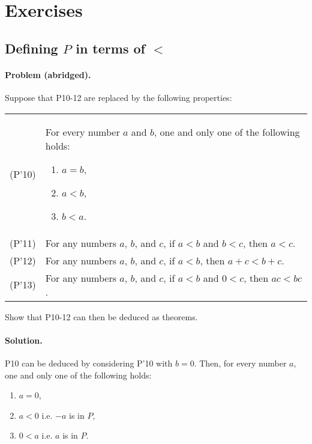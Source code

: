 \documentclass{article}
\begin{document}
\section{Exercises}

\setcounter{subsection}{7}
\subsection{Defining $P$ in terms of $<$}

\paragraph{Problem (abridged).} Suppose that P10-12 are replaced by the following properties:

\begin{tabular}{l p{4in}}
  (P'10) & For every number $a$ and $b$, one and only one of the following holds: \begin{enumerate}
      \itemsep0em
      \item $a = b$,
      \item $a < b$,
      \item $b < a$. \label{p'10}
    \end{enumerate} \\
  (P'11) & For any numbers $a$, $b$, and $c$, if $a < b$ and $b < c$, then $a < c$. \label{p'11} \\
  (P'12) & For any numbers $a$, $b$, and $c$, if $a < b$, then $a + c < b + c$. \label{p'12} \\
  (P'13) & For any numbers $a$, $b$, and $c$, if $a < b$ and $0 < c$, then $ac < bc$. \label{p'13} \\
\end{tabular}

Show that P10-12 can then be deduced as theorems.

\paragraph{Solution.} P10 can be deduced by considering P'10 with $b = 0$. Then, for every number $a$, one and only one of the following holds: \begin{enumerate}
    \itemsep0em
    \item $a = 0$,
    \item $a < 0$ i.e. $-a$ is in $P$,
    \item $0 < a$ i.e. $a$ is in $P$.
\end{enumerate}
\end{document}
